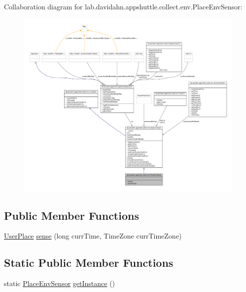 \-Collaboration diagram for lab.\-davidahn.\-appshuttle.\-collect.\-env.\-Place\-Env\-Sensor\-:
\nopagebreak
\begin{figure}[H]
\begin{center}
\leavevmode
\includegraphics[width=350pt]{classlab_1_1davidahn_1_1appshuttle_1_1collect_1_1env_1_1_place_env_sensor__coll__graph}
\end{center}
\end{figure}
\subsection*{\-Public \-Member \-Functions}
\begin{DoxyCompactItemize}
\item 
\hyperlink{classlab_1_1davidahn_1_1appshuttle_1_1collect_1_1env_1_1_user_place}{\-User\-Place} \hyperlink{classlab_1_1davidahn_1_1appshuttle_1_1collect_1_1env_1_1_place_env_sensor_ac96c411e6dda6a51c6b5f14f614f1a7c}{sense} (long curr\-Time, \-Time\-Zone curr\-Time\-Zone)
\end{DoxyCompactItemize}
\subsection*{\-Static \-Public \-Member \-Functions}
\begin{DoxyCompactItemize}
\item 
static \hyperlink{classlab_1_1davidahn_1_1appshuttle_1_1collect_1_1env_1_1_place_env_sensor}{\-Place\-Env\-Sensor} \hyperlink{classlab_1_1davidahn_1_1appshuttle_1_1collect_1_1env_1_1_place_env_sensor_a70c67d2bd90b620ccfa0e49e84ffdbde}{get\-Instance} ()
\end{DoxyCompactItemize}


